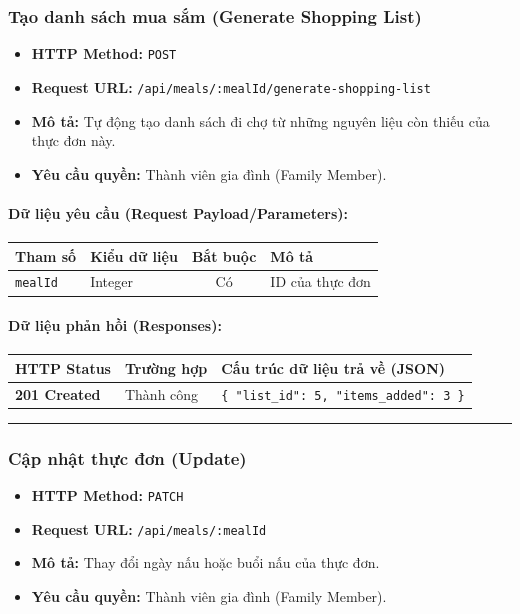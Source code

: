 \documentclass[12pt,a4paper]{article}
\begin{document}
\subsubsection{Tạo danh sách mua sắm (Generate Shopping List)}
\begin{itemize}[leftmargin=*]
    \item \textbf{HTTP Method:} \texttt{POST}
    \item \textbf{Request URL:} \texttt{/api/meals/:mealId/generate-shopping-list}
    \item \textbf{Mô tả:} Tự động tạo danh sách đi chợ từ những nguyên liệu còn thiếu của thực đơn này.
    \item \textbf{Yêu cầu quyền:} Thành viên gia đình (Family Member).
\end{itemize}

\paragraph{Dữ liệu yêu cầu (Request Payload/Parameters):}
\begin{longtable}{|>{\raggedright\arraybackslash}p{2.8cm}|>{\raggedright\arraybackslash}p{2.2cm}|c|>{\raggedright\arraybackslash}p{7.0cm}|}
\hline
\textbf{Tham số} & \textbf{Kiểu dữ liệu} & \textbf{Bắt buộc} & \textbf{Mô tả} \\ \hline
\endhead
\texttt{mealId} & Integer & Có & ID của thực đơn \\ \hline
\end{longtable}

\paragraph{Dữ liệu phản hồi (Responses):}
\begin{longtable}{|>{\raggedright\arraybackslash}p{2.8cm}|>{\raggedright\arraybackslash}p{3.2cm}|>{\raggedright\arraybackslash}p{8.0cm}|}
\hline
\textbf{HTTP Status} & \textbf{Trường hợp} & \textbf{Cấu trúc dữ liệu trả về (JSON)} \\ \hline
\endhead
\textbf{201 Created} & Thành công & \texttt{\{ "list\_id": 5, "items\_added": 3 \}} \\ \hline
\end{longtable}

\vskip 0.4cm
\noindent\rule{\textwidth}{0.3pt}
\vskip 0.4cm

\subsubsection{Cập nhật thực đơn (Update)}
\begin{itemize}[leftmargin=*]
    \item \textbf{HTTP Method:} \texttt{PATCH}
    \item \textbf{Request URL:} \texttt{/api/meals/:mealId}
    \item \textbf{Mô tả:} Thay đổi ngày nấu hoặc buổi nấu của thực đơn.
    \item \textbf{Yêu cầu quyền:} Thành viên gia đình (Family Member).
\end{itemize}
\end{document}
